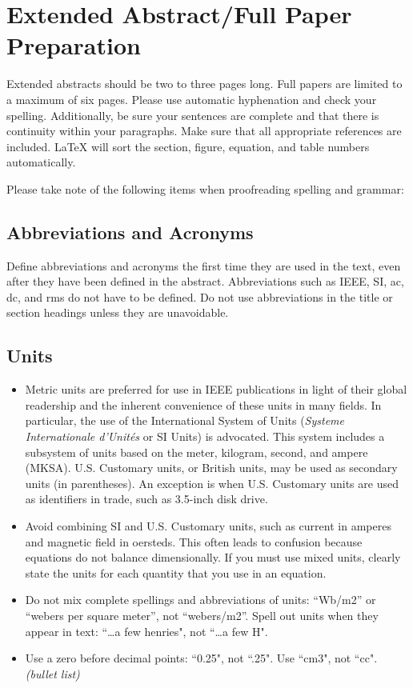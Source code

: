 \documentclass[conference]{IEEEtran}
\begin{document}
\section{Extended Abstract/Full Paper Preparation}
Extended abstracts should be two to three pages long. Full papers are limited to a maximum of six pages. Please use automatic hyphenation and check your spelling. Additionally, be sure your sentences are complete and that there is continuity within your paragraphs. Make sure that all appropriate references are included. \LaTeX{} will sort the section, figure, equation, and table numbers automatically.

Please take note of the following items when proofreading spelling and grammar:

\subsection{Abbreviations and Acronyms}
Define abbreviations and acronyms the first time they are used in the text, even after they have been defined in the abstract. Abbreviations such as IEEE, SI, ac, dc, and rms do not have to be defined. Do not use abbreviations in the title or section headings unless they are unavoidable.

\subsection{Units}
\begin{itemize}
    \item Metric units are preferred for use in IEEE publications in light of their global readership and the inherent convenience of these units in many fields. In particular, the use of the International System of Units (\emph{Systeme Internationale d'Unit\'{e}s} or SI Units) is advocated. This system includes a subsystem of units based on the meter, kilogram, second, and ampere (MKSA). U.S. Customary units, or British units, may be used as secondary units (in parentheses). An exception is when U.S. Customary units are used as identifiers in trade, such as 3.5-inch disk drive.

    \item Avoid combining SI and U.S. Customary units, such as current in amperes and magnetic field in oersteds. This often leads to confusion because equations do not balance dimensionally. If you must use mixed units, clearly state the units for each quantity that you use in an equation.

    \item Do not mix complete spellings and abbreviations of units: ``Wb/m2'' or ``webers per square meter'', not ``webers/m2''.  Spell out units when they appear in text: ``\ldots a few henries", not ``\ldots a few H".

    \item Use a zero before decimal points: ``0.25", not ``.25". Use ``cm3", not ``cc". \emph{(bullet list)}
\end{itemize}
\end{document}
